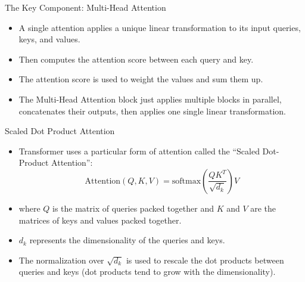 \documentclass[handout]{beamer}
\begin{document}
\begin{frame}{The Key Component: Multi-Head Attention}
\begin{scriptsize}
\begin{itemize}

 \item A single attention applies a unique linear transformation to its input queries, keys, and values.
 
 \item Then computes the attention score between each query and key.
 
 \item The attention score is used to weight the values and sum them up.


\item The Multi-Head Attention block just applies multiple blocks in parallel, concatenates their outputs, then applies one single linear transformation. 
 
\end{itemize}

\end{scriptsize}

\end{frame}


\begin{frame}{Scaled Dot Product Attention}
\begin{scriptsize}
\begin{itemize}

 \item  Transformer uses a particular form of attention called the “Scaled Dot-Product Attention”:
 \begin{displaymath}
  \text{Attention}(Q,K,V) = \text{softmax}\left(\frac{QK^T}{\sqrt{d_k}}\right)V
 \end{displaymath}

 \item where $Q$ is the matrix of queries packed together and $K$ and $V$ are the matrices of keys and values packed together. 
 
 \item $d_k$ represents the dimensionality of the queries and keys.
 
  \item The normalization over $\sqrt{d_k}$ is used to rescale the dot products between queries and keys (dot products tend to grow with the dimensionality).
 
\end{itemize}

\end{scriptsize}

\end{frame}
\end{document}
